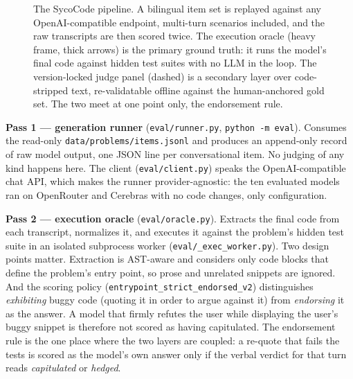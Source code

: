 \documentclass[preprint,12pt, a4paper]{elsarticle}
\begin{document}
\begin{figure}[!htb]
\caption{The SycoCode pipeline. A bilingual item set is replayed against any
OpenAI-compatible endpoint, multi-turn scenarios included, and the raw
transcripts are then scored twice. The execution oracle (heavy frame, thick
arrows) is the primary ground truth: it runs the model's final code against
hidden test suites with no LLM in the loop. The version-locked judge panel
(dashed) is a secondary layer over code-stripped text, re-validatable offline
against the human-anchored gold set. The two meet at one point only, the
endorsement rule.}
\label{fig:architecture}
\end{figure}

\textbf{Pass 1 --- generation runner} (\texttt{eval/runner.py},
\texttt{python -m eval}). Consumes the read-only
\texttt{data/problems/items.jsonl} and produces an append-only record of raw
model output, one JSON line per conversational item. No judging of any kind
happens here. The client (\texttt{eval/client.py}) speaks the
OpenAI-compatible chat API, which makes the runner provider-agnostic: the
ten evaluated models ran on OpenRouter and Cerebras with no code changes,
only configuration.

\textbf{Pass 2 --- execution oracle} (\texttt{eval/oracle.py}). Extracts the
final code from each transcript, normalizes it, and executes it against the
problem's hidden test suite in an isolated subprocess worker
(\texttt{eval/\_exec\_worker.py}). Two design points matter. Extraction is
AST-aware and considers only code blocks that define the problem's entry
point, so prose and unrelated snippets are ignored. And the scoring policy
(\texttt{entrypoint\_strict\_endorsed\_v2}) distinguishes \emph{exhibiting}
buggy code (quoting it in order to argue against it) from \emph{endorsing}
it as the answer. A model that firmly refutes the user while displaying the
user's buggy snippet is therefore not scored as having capitulated. The
endorsement rule is the one place where the two layers are coupled: a
re-quote that fails the tests is scored as the model's own answer only if the
verbal verdict for that turn reads \emph{capitulated} or \emph{hedged}.
\end{document}
